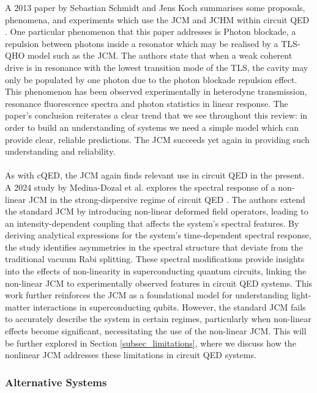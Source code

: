 \documentclass[12pt,a4paper]{article}
\begin{document}
A 2013 paper by Sebastian Schmidt and Jens Koch summarises some proposals, phenomena, and experiments which use the JCM and JCHM within circuit QED \cite{Context2013-CircuitQED}. One particular phenomenon that this paper addresses is Photon blockade, a repulsion between photons inside a resonator which may be realised by a TLS-QHO model such as the JCM. The authors state that when a weak coherent drive is in resonance with the lowest transition mode of the TLS, the cavity may only be populated by one photon due to the photon blockade repulsion effect. This phenomenon has been observed experimentally in heterodyne transmission, resonance fluorescence spectra and photon statistics in linear response. The paper's conclusion reiterates a clear trend that we see throughout this review: in order to build an understanding of systems we need a simple model which can provide clear, reliable predictions. The JCM succeeds yet again in providing such understanding and reliability.\\
\\
As with cQED, the JCM again finds relevant use in circuit QED in the present. A 2024 study by Medina-Dozal et al. explores the spectral response of a non-linear JCM in the strong-dispersive regime of circuit QED \cite{Context2024-CircuitQED}. The authors extend the standard JCM by introducing non-linear deformed field operators, leading to an intensity-dependent coupling that affects the system’s spectral features. By deriving analytical expressions for the system’s time-dependent spectral response, the study identifies asymmetries in the spectral structure that deviate from the traditional vacuum Rabi splitting. These spectral modifications provide insights into the effects of non-linearity in superconducting quantum circuits, linking the non-linear JCM to experimentally observed features in circuit QED systems. This work further reinforces the JCM as a foundational model for understanding light-matter interactions in superconducting qubits. However, the standard JCM fails to accurately describe the system in certain regimes, particularly when non-linear effects become significant, necessitating the use of the non-linear JCM. This will be further explored in Section \ref{subsec_limitations}, where we discuss how the nonlinear JCM addresses these limitations in circuit QED systems.

\subsubsection{Alternative Systems}
\end{document}
